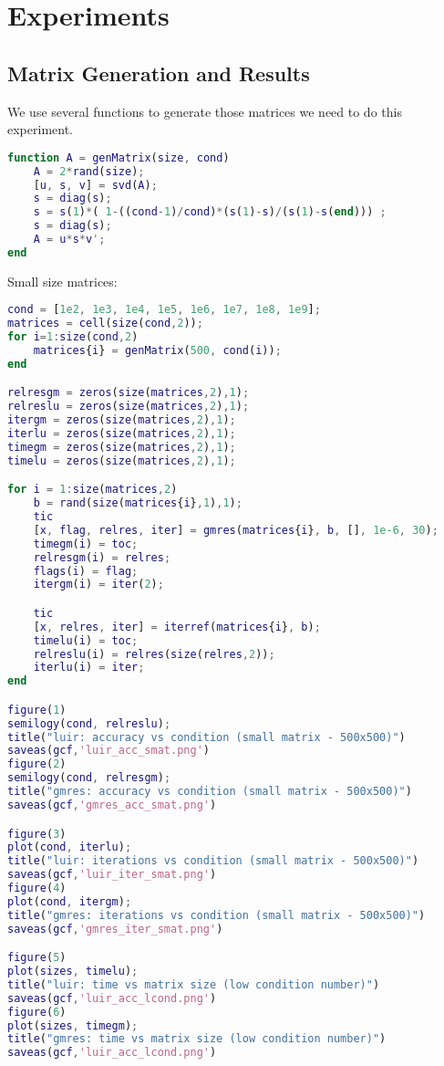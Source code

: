 \section{Experiments}

\subsection{Matrix Generation and Results}
We use several functions to generate those matrices we need to do this experiment.
\begin{lstlisting}[language=Matlab, caption=generating matrix with the specified condition number]
function A = genMatrix(size, cond)
    A = 2*rand(size);
    [u, s, v] = svd(A);
    s = diag(s);
    s = s(1)*( 1-((cond-1)/cond)*(s(1)-s)/(s(1)-s(end))) ;
    s = diag(s);
    A = u*s*v';
end
\end{lstlisting}
Small size matrices:
\begin{lstlisting}[language=Matlab, caption=Small size mtrix]
    cond = [1e2, 1e3, 1e4, 1e5, 1e6, 1e7, 1e8, 1e9];
matrices = cell(size(cond,2));
for i=1:size(cond,2)
    matrices{i} = genMatrix(500, cond(i));
end

relresgm = zeros(size(matrices,2),1);
relreslu = zeros(size(matrices,2),1);
itergm = zeros(size(matrices,2),1);
iterlu = zeros(size(matrices,2),1);
timegm = zeros(size(matrices,2),1);
timelu = zeros(size(matrices,2),1);

for i = 1:size(matrices,2)
    b = rand(size(matrices{i},1),1);
    tic
    [x, flag, relres, iter] = gmres(matrices{i}, b, [], 1e-6, 30);
    timegm(i) = toc;
    relresgm(i) = relres;
    flags(i) = flag;
    itergm(i) = iter(2);

    tic
    [x, relres, iter] = iterref(matrices{i}, b);
    timelu(i) = toc;
    relreslu(i) = relres(size(relres,2));
    iterlu(i) = iter;
end

figure(1)
semilogy(cond, relreslu);
title("luir: accuracy vs condition (small matrix - 500x500)")
saveas(gcf,'luir_acc_smat.png')
figure(2)
semilogy(cond, relresgm);
title("gmres: accuracy vs condition (small matrix - 500x500)")
saveas(gcf,'gmres_acc_smat.png')

figure(3)
plot(cond, iterlu);
title("luir: iterations vs condition (small matrix - 500x500)")
saveas(gcf,'luir_iter_smat.png')
figure(4)
plot(cond, itergm);
title("gmres: iterations vs condition (small matrix - 500x500)")
saveas(gcf,'gmres_iter_smat.png')

figure(5)
plot(sizes, timelu);
title("luir: time vs matrix size (low condition number)")
saveas(gcf,'luir_acc_lcond.png')
figure(6)
plot(sizes, timegm);
title("gmres: time vs matrix size (low condition number)")
saveas(gcf,'luir_acc_lcond.png')

\end{lstlisting}  
